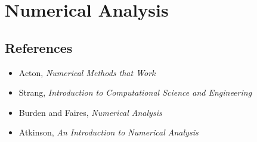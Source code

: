 \section{Numerical Analysis}
\subsection*{References}
\begin{itemize}
    \item Acton, \emph{Numerical Methods that Work}
    \item Strang, \emph{Introduction to Computational Science and Engineering}
    \item Burden and Faires, \emph{Numerical Analysis}
    \item Atkinson, \emph{An Introduction to Numerical Analysis}
\end{itemize}
